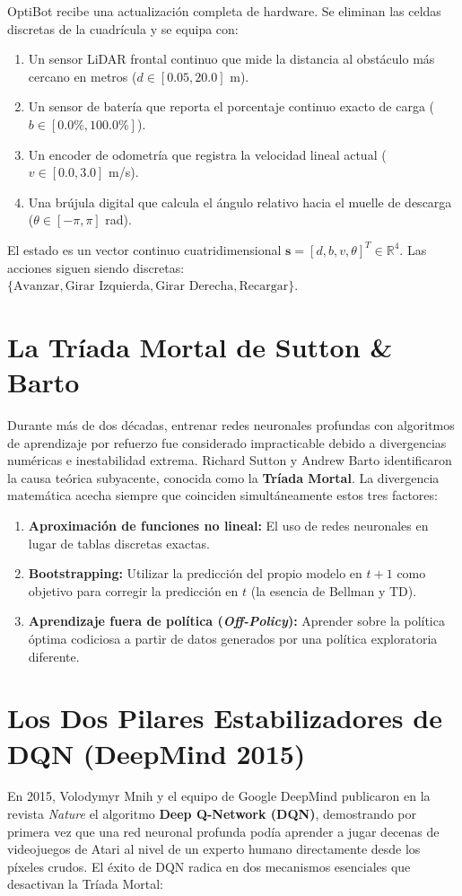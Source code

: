 \begin{optibot}
OptiBot recibe una actualización completa de hardware. Se eliminan las celdas discretas de la cuadrícula y se equipa con:
\begin{enumerate}
  \item Un sensor LiDAR frontal continuo que mide la distancia al obstáculo más cercano en metros ($d \in [0.05, 20.0]$ m).
  \item Un sensor de batería que reporta el porcentaje continuo exacto de carga ($b \in [0.0\%, 100.0\%]$).
  \item Un encoder de odometría que registra la velocidad lineal actual ($v \in [0.0, 3.0]$ m/s).
  \item Una brújula digital que calcula el ángulo relativo hacia el muelle de descarga ($\theta \in [-\pi, \pi]$ rad).
\end{enumerate}
El estado es un vector continuo cuatridimensional $\mathbf{s} = [d, b, v, \theta]^T \in \mathbb{R}^4$. Las acciones siguen siendo discretas: $\{ \text{Avanzar}, \text{Girar Izquierda}, \text{Girar Derecha}, \text{Recargar} \}$.
\end{optibot}

\section{La Tríada Mortal de Sutton \& Barto}
Durante más de dos décadas, entrenar redes neuronales profundas con algoritmos de aprendizaje por refuerzo fue considerado impracticable debido a divergencias numéricas e inestabilidad extrema. Richard Sutton y Andrew Barto identificaron la causa teórica subyacente, conocida como la \textbf{Tríada Mortal}. La divergencia matemática acecha siempre que coinciden simultáneamente estos tres factores:
\begin{enumerate}
  \item \textbf{Aproximación de funciones no lineal:} El uso de redes neuronales en lugar de tablas discretas exactas.
  \item \textbf{Bootstrapping:} Utilizar la predicción del propio modelo en $t+1$ como objetivo para corregir la predicción en $t$ (la esencia de Bellman y TD).
  \item \textbf{Aprendizaje fuera de política (\textit{Off-Policy}):} Aprender sobre la política óptima codiciosa a partir de datos generados por una política exploratoria diferente.
\end{enumerate}

\section{Los Dos Pilares Estabilizadores de DQN (DeepMind 2015)}
En 2015, Volodymyr Mnih y el equipo de Google DeepMind publicaron en la revista \textit{Nature} el algoritmo \textbf{Deep Q-Network (DQN)}, demostrando por primera vez que una red neuronal profunda podía aprender a jugar decenas de videojuegos de Atari al nivel de un experto humano directamente desde los píxeles crudos. El éxito de DQN radica en dos mecanismos esenciales que desactivan la Tríada Mortal:

